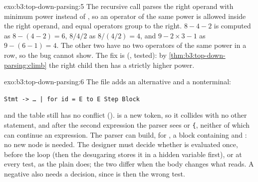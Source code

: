 \begin{solution}{exo:b3:top-down-parsing:5}
The recursive call parses the right operand with minimum power  instead of , so an operator of the same power is allowed inside the right operand, and equal operators group to the right. $8 - 4 - 2$ is computed as $8 - (4 - 2) = 6$, $8/4/2$ as $8/(4/2) = 4$, and $9 - 2 \times 3 - 1$ as $9 - (6 - 1) = 4$. The other two have no two operators of the same power in a row, so the bug cannot show. The fix is  (, tested): by \cref{thm:b3:top-down-parsing:climb} the right child then has a strictly higher power.
\end{solution}

\begin{solution}{exo:b3:top-down-parsing:6}
The file  adds an alternative and a nonterminal:
\begin{center}\texttt{Stmt -> \dots{} | for id = E to E Step Block}\qquad {}\end{center}
and the table still has no conflict ().  is a new token, so it collides with no other statement, and after the second expression the parser sees  or \texttt{\{}, neither of which can continue an expression. The parser can build, for , a block containing  and : no new node is needed. The designer must decide whether  is evaluated once, before the loop (then the desugaring stores it in a hidden variable first), or at every test, as the plain  does; the two differ when the body changes what  reads. A negative  also needs a decision, since \code{<=} is then the wrong test.
\end{solution}

